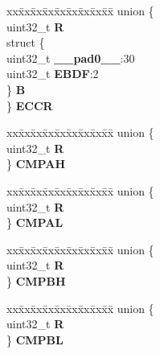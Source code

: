 \begin{DoxyCompactItemize}
\begin{tabbing}
\end{tabbing}\item 
\mbox{\label{structSIU__tag_afc85641ad86fde6bbdc0ce96025e260d}} 
\begin{tabbing}
xx\=xx\=xx\=xx\=xx\=xx\=xx\=xx\=xx\=\kill
union \{\\
\>uint32\_t {\bfseries R}\\
\>struct \{\\
\>\>uint32\_t {\bfseries \_\_pad0\_\_}:30\\
\>\>uint32\_t {\bfseries EBDF}:2\\
\>\} {\bfseries B}\\
\} {\bfseries ECCR}\\

\end{tabbing}\item 
\mbox{\label{structSIU__tag_a222e53a48c40d0547f30097133b7728f}} 
\begin{tabbing}
xx\=xx\=xx\=xx\=xx\=xx\=xx\=xx\=xx\=\kill
union \{\\
\>uint32\_t {\bfseries R}\\
\} {\bfseries CMPAH}\\

\end{tabbing}\item 
\mbox{\label{structSIU__tag_a50027fa303b396d3b5edd80b428345f0}} 
\begin{tabbing}
xx\=xx\=xx\=xx\=xx\=xx\=xx\=xx\=xx\=\kill
union \{\\
\>uint32\_t {\bfseries R}\\
\} {\bfseries CMPAL}\\

\end{tabbing}\item 
\mbox{\label{structSIU__tag_ad86e702df3edadb07c3d35730ec0ebd4}} 
\begin{tabbing}
xx\=xx\=xx\=xx\=xx\=xx\=xx\=xx\=xx\=\kill
union \{\\
\>uint32\_t {\bfseries R}\\
\} {\bfseries CMPBH}\\

\end{tabbing}\item 
\mbox{\label{structSIU__tag_adb1e3d773c2a213fa4ceda7ed7807f75}} 
\begin{tabbing}
xx\=xx\=xx\=xx\=xx\=xx\=xx\=xx\=xx\=\kill
union \{\\
\>uint32\_t {\bfseries R}\\
\} {\bfseries CMPBL}\\


\end{tabbing}
\end{DoxyCompactItemize}
